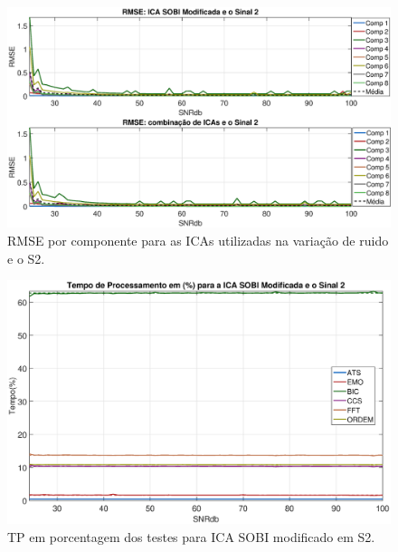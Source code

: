 \documentclass[a4paper,12pt]{monografia}
\theoremstyle{plain}
\theoremstyle{definition}
\theoremstyle{remark}
\begin{document}
\begin{figure}[!htb]
    \begin{center}
    \advance\leftskip -1.5cm
    \includegraphics[scale=0.45]{imagens/ImagensParaOAnexo/RMSEcompRTodasICAsSinal2.eps}
    \caption{RMSE por componente para as ICAs utilizadas na variação de ruido e o S2.}
    \label{fig:RMSERS2}    
    \end{center}
\end{figure}

\begin{figure}[!htb]
    \begin{center}
    \advance\leftskip -1.5cm
    \includegraphics[scale=0.45]{imagens/ImagensParaOAnexo/TPPRICASOBImodSinal2.eps}
    \caption{TP em porcentagem dos testes para ICA SOBI modificado em S2.}
    \label{fig:TPSMRS2}    
    \end{center}
\end{figure}
\end{document}

